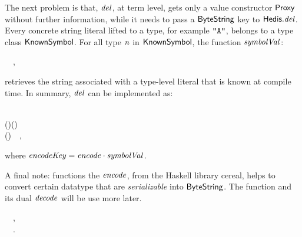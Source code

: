 The next problem is that, \ensuremath{\Varid{del}}, at term level, gets only a value constructor
\ensuremath{\Conid{Proxy}} without further information, while it needs to pass a \ensuremath{\Conid{ByteString}} key
to \ensuremath{\Varid{\Conid{Hedis}.del}}. Every concrete string literal lifted to a type, for example
\ensuremath{\text{\tt \char34 A\char34}}, belongs to a type class \ensuremath{\Conid{KnownSymbol}}. For all type \ensuremath{\Varid{n}} in \ensuremath{\Conid{KnownSymbol}},
the function \ensuremath{\Varid{symbolVal}}:\begin{hscode}\SaveRestoreHook
{}%
%
%
\>[3]{}\mathbin{::}\;\Rightarrow {}\;\to {}~~,{}\<[E]%
\ColumnHook
\end{hscode}\resethooks
retrieves the string associated with a type-level literal that is known at
compile time. In summary, \ensuremath{\Varid{del}} can be implemented as:
\begin{hscode}\SaveRestoreHook
{}%
%
%
%
\>[B]{}\<[6]%
\>[6]{}\mathbin{::}\;\<[E]%
\\
\>[6]{}\Rightarrow {}\;\to {}\;\;(\;\;)\;(\;\;){}\<[E]%
\\
\>[B]{}\;\mathrel{=}\;(){}\<[45]%
\>[45]{}~~,{}\<[E]%
\ColumnHook
\end{hscode}\resethooks
where \ensuremath{\Varid{encodeKey}\mathrel{=}\Varid{encode}\mathbin{\cdot}\Varid{symbolVal}}.

A final note: functions the \ensuremath{\Varid{encode}}, from the Haskell library {\sc cereal},
helps to convert certain datatype that are {\em serializable} into \ensuremath{\Conid{ByteString}}.
The function and its dual \ensuremath{\Varid{decode}} will be use more later.
\begin{hscode}\SaveRestoreHook
{}%
%
%
\>[B]{}\<[9]%
\>[9]{}\mathbin{::}\;\Rightarrow {}\to {}~~,{}\<[E]%
\\
\>[B]{}\<[9]%
\>[9]{}\mathbin{::}\;\Rightarrow {}\to {}\;\;~~.{}\<[E]%
\ColumnHook
\end{hscode}\resethooks

